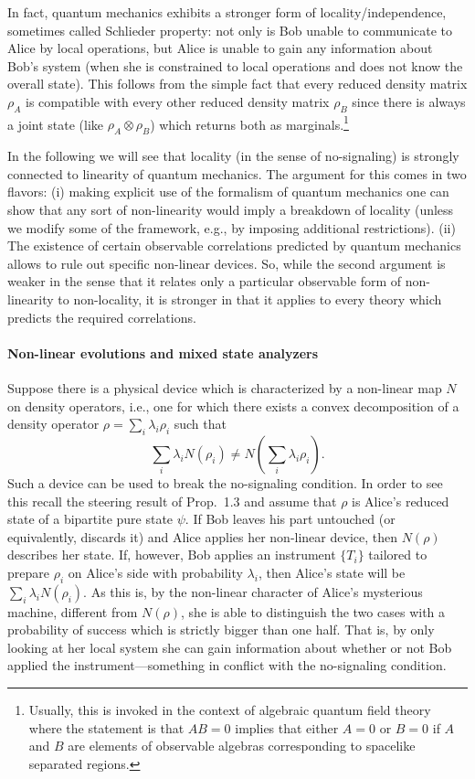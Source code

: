 \documentclass[11pt,a4paper]{article}
\theoremstyle{plain}
\theoremstyle{definition}
\theoremstyle{remark}
\numberwithin{equation}{section}
\begin{document}
In fact, quantum mechanics exhibits a stronger form of locality/independence, sometimes called Schlieder property: not only is Bob unable to communicate to Alice by local operations, but Alice is unable to gain any information about Bob's system (when she is constrained to local operations and does not know the overall state). This follows from the simple fact that every reduced density matrix $\rho_A$ is compatible with every other reduced density matrix $\rho_B$ since there is always a joint state (like $\rho_A\otimes \rho_B$) which returns both as marginals.\footnote{Usually, this is invoked in the context of algebraic quantum field theory where the statement is that $AB=0$ implies that either $A=0$ or $B=0$ if $A$ and $B$ are elements of observable algebras corresponding to spacelike separated regions.}

In the following we will see that locality (in the sense of no-signaling) is strongly connected to linearity of quantum mechanics. The argument for this comes in two flavors: (i) making explicit use of the formalism of quantum mechanics one can show that any sort of non-linearity would imply a breakdown of locality (unless we modify some of the framework, e.g., by imposing additional restrictions). (ii) The existence of certain observable correlations predicted by quantum mechanics allows to rule out specific non-linear devices. So, while the second argument is weaker in the sense that it relates only a particular observable form of non-linearity to non-locality, it is stronger in that it applies to every theory which predicts the required correlations.

\paragraph{Non-linear evolutions and mixed state analyzers}
Suppose there is a physical device which is characterized by a non-linear map $N$ on density operators, i.e., one for which there exists a convex decomposition of a density operator $\rho=\sum_i \lambda_i\rho_i$ such that
\begin{equation}
    \sum_i \lambda_i N(\rho_i) \ne N\!\left(\sum_i \lambda_i \rho_i\right).
\end{equation}
Such a device can be used to break the no-signaling condition. In order to see this recall the steering result of Prop.~1.3 and assume that $\rho$ is Alice's reduced state of a bipartite pure state $\psi$. If Bob leaves his part untouched (or equivalently, discards it) and Alice applies her non-linear device, then $N(\rho)$ describes her state. If, however, Bob applies an instrument $\{T_i\}$ tailored to prepare $\rho_i$ on Alice's side with probability $\lambda_i$, then Alice's state will be $\sum_i \lambda_i N(\rho_i)$. As this is, by the non-linear character of Alice's mysterious machine, different from $N(\rho)$, she is able to distinguish the two cases with a probability of success which is strictly bigger than one half. That is, by only looking at her local system she can gain information about whether or not Bob applied the instrument---something in conflict with the no-signaling condition.
\end{document}
